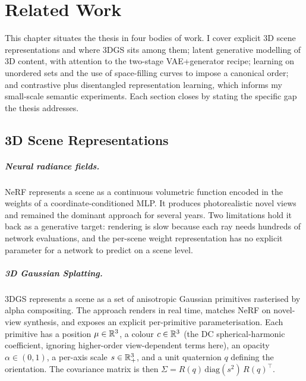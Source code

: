 \chapter{Related Work}
\label{chap:related}

This chapter situates the thesis in four bodies of work. I cover explicit 3D scene representations and where 3DGS sits among them; latent generative modelling of 3D content, with attention to the two-stage VAE+generator recipe; learning on unordered sets and the use of space-filling curves to impose a canonical order; and contrastive plus disentangled representation learning, which informs my small-scale semantic experiments. Each section closes by stating the specific gap the thesis addresses.

\section{3D Scene Representations}
\label{sec:rw_repr}

\paragraph{Neural radiance fields.}
NeRF \citep{mildenhall2020nerf} represents a scene as a continuous volumetric function encoded in the weights of a coordinate-conditioned MLP. It produces photorealistic novel views and remained the dominant approach for several years. Two limitations hold it back as a generative target: rendering is slow because each ray needs hundreds of network evaluations, and the per-scene weight representation has no explicit parameter for a network to predict on a scene level.

\paragraph{3D Gaussian Splatting.}
3DGS \citep{kerbl2023gaussian} represents a scene as a set of anisotropic Gaussian primitives rasterised by alpha compositing. The approach renders in real time, matches NeRF on novel-view synthesis, and exposes an explicit per-primitive parameterisation. Each primitive has a position $\mu \in \mathbb{R}^3$, a colour $c \in \mathbb{R}^3$ (the DC spherical-harmonic coefficient, ignoring higher-order view-dependent terms here), an opacity $\alpha \in (0,1)$, a per-axis scale $s \in \mathbb{R}^3_+$, and a unit quaternion $q$ defining the orientation. The covariance matrix is then $\Sigma = R(q)\,\mathrm{diag}(s^2)\,R(q)^\top$.

